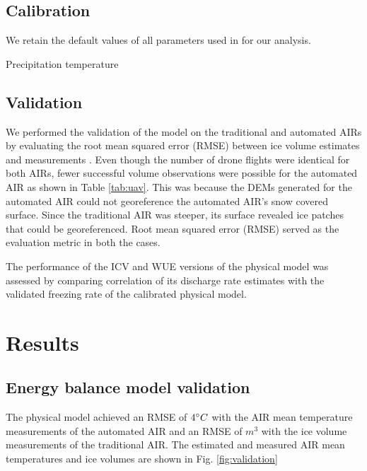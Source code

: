 \documentclass[tc, manuscript]{copernicus}
\begin{document}
\subsection{Calibration}

We retain the default values of all parameters used in
\cite{balasubramanianInfluenceMeteorologicalConditions2022} for our analysis.  

Precipitation temperature

\subsection{Validation}

We performed the validation of the model on the traditional and automated AIRs by evaluating the root mean
squared error (RMSE) between ice volume estimates and measurements . Even though the number of drone flights
were identical for both AIRs, fewer successful volume observations were possible for the automated AIR as shown
in Table \ref{tab:uav}. This was because the DEMs generated for the automated AIR could not georeference the
automated AIR's snow covered surface. Since the traditional AIR was steeper, its surface revealed ice patches
that could be georeferenced. Root mean squared error (RMSE) served as the evaluation metric in both the cases.

The performance of the ICV and WUE versions of the physical model was assessed by comparing correlation of its
discharge rate estimates with the validated freezing rate of the calibrated physical model.

\section{Results}

\subsection{Energy balance model validation}
The physical model achieved an RMSE of $4 ^{\circ} C$ with the AIR mean temperature measurements of the automated AIR and an RMSE of $m^3$ with the ice volume measurements of the traditional AIR. The estimated and measured AIR
mean temperatures and ice volumes are shown in Fig. \ref{fig:validation}
 
\end{document}

